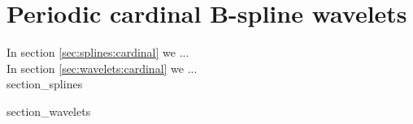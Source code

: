 \documentclass[12pt, class = report, crop = false, a4paper, twoside]{standalone}
\begin{document}
\chapter{Periodic cardinal B-spline wavelets}
\label{chap:II}

In section \ref{sec:splines:cardinal} we ... \\
In section \ref{sec:wavelets:cardinal} we ... \\

{section_splines}

{section_wavelets}
\end{document}
